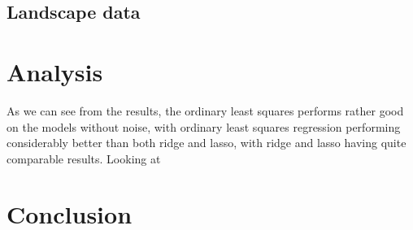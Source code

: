 \documentclass{article}
\begin{document}
\subsection{Landscape data}


\section{Analysis}
As we can see from the results, the ordinary least squares performs rather good
on the models without noise, with ordinary least squares regression performing
considerably better than both ridge and lasso, with ridge and lasso having quite
comparable results. Looking at

\section{Conclusion}


\end{document}
